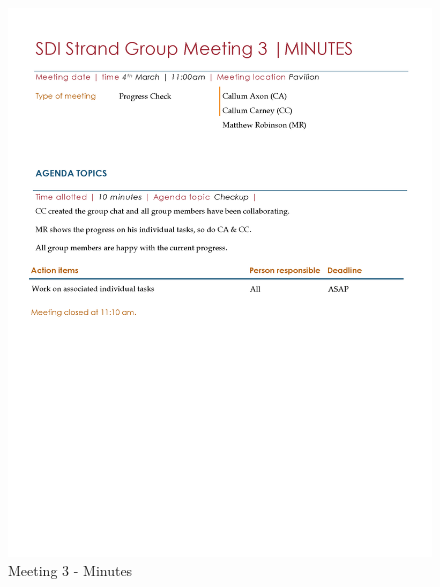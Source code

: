\documentclass[
  english,
  a4paper,
,tablecaptionabove
]{scrartcl}
\begin{document}
\begin{figure}
\centering
\includegraphics{images/meeting-minutes/meeting-3.png}
\caption{Meeting 3 - Minutes}
\end{figure}
\end{document}
